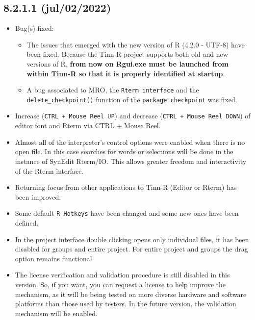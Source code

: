 \subsection*{8.2.1.1 (jul/02/2022)}
\begin{itemize}
  \item Bug(s) fixed:
    \begin{itemize}
        \item The issues that emerged with the new version of R (4.2.0 - UTF-8) have been fixed.
          Because the Tinn-R project supports both old and new versions of R, \textbf{from now on Rgui.exe must be launched from within Tinn-R so that it is properly
          identified at startup}.
      \item A bug associated to MRO, the \texttt{Rterm interface} and the \texttt{delete\_checkpoint()} function of the \texttt{package checkpoint} was fixed.
    \end{itemize}
  \item Increase (\texttt{CTRL + Mouse Reel UP}) and decrease (\texttt{CTRL + Mouse Reel DOWN}) of editor font and Rterm via CTRL + Mouse Reel.
  \item Almost all of the interpreter's control options were enabled when there is no open file. In this case searches for words or selections will be done
    in the instance of SynEdit Rterm/IO. This allows greater freedom and interactivity of the Rterm interface.
  \item Returning focus from other applications to Tinn-R (Editor or Rterm) has been improved.
  \item Some default \texttt{R Hotkeys} have been changed and some new ones have been defined.
  \item In the project interface double clicking opens only individual files, it has been disabled for groups and entire project. For entire project and groups
    the drag option remains functional.
  \item The license verification and validation procedure is still disabled in this version.
    So, if you want, you can request a license to help improve the mechanism,
    as it will be being tested on more diverse hardware and software platforms than
    those used by testers. In the future version, the validation mechanism will be enabled.
\end{itemize}
